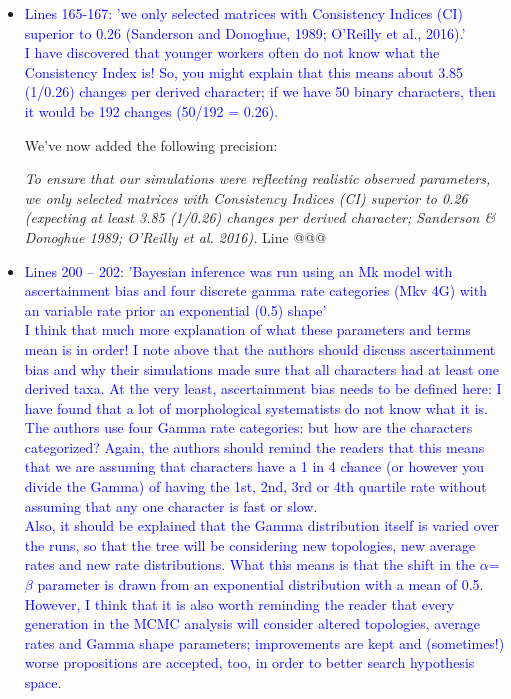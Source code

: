 \documentclass[12pt,letterpaper]{article}
\begin{document}
\begin{itemize}
\item{\textcolor{blue}{Lines 165-167: 'we only selected matrices with Consistency Indices (CI) superior to 0.26 (Sanderson and Donoghue, 1989; O'Reilly et al., 2016).'
\\
I have discovered that younger workers often do not know what the Consistency Index is! So, you might explain that this means about 3.85 (1/0.26) changes per derived character; if we have 50 binary characters, then it would be 192 changes (50/192 = 0.26).}}

We've now added the following precision:

\textit{To ensure that our simulations were reflecting realistic observed parameters, we only selected matrices with Consistency Indices (CI) superior to 0.26 (expecting at least 3.85 (1/0.26) changes per derived character; Sanderson \& Donoghue 1989; O'Reilly et al. 2016).} Line @@@



\item{\textcolor{blue}{Lines 200 – 202: 'Bayesian inference was run using an Mk model with ascertainment bias and four discrete gamma rate categories (Mkv 4G) with an variable rate prior an exponential (0.5) shape'
\\
I think that much more explanation of what these parameters and terms mean is in order! I note above that the authors should discuss ascertainment bias and why their simulations made sure that all characters had at least one derived taxa. At the very least, ascertainment bias needs to be defined here: I have found that a lot of morphological systematists do not know what it is.
\\
The authors use four Gamma rate categories: but how are the characters categorized? Again, the authors should remind the readers that this means that we are assuming that characters have a 1 in 4 chance (or however you divide the Gamma) of having the 1st, 2nd, 3rd or 4th quartile rate without assuming that any one character is fast or slow.
\\
Also, it should be explained that the Gamma distribution itself is varied over the runs, so that the tree will be considering new topologies, new average rates and new rate distributions. What this means is that the shift in the $\alpha$=$\beta$ parameter is drawn from an exponential distribution with a mean of 0.5. However, I think that it is also worth reminding the reader that every generation in the MCMC analysis will consider altered topologies, average rates and Gamma shape parameters; improvements are kept and (sometimes!) worse propositions are accepted, too, in order to better search hypothesis space.}}


\end{itemize}
\end{document}

